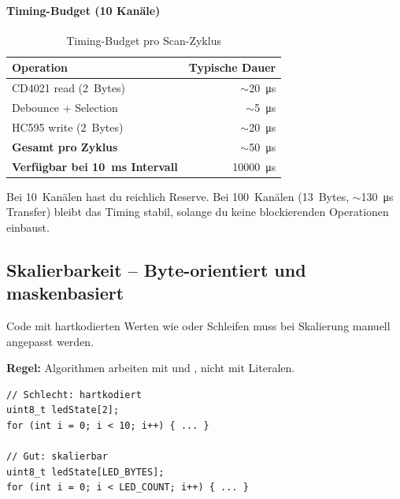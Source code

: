 \paragraph{Timing-Budget (10 Kanäle)}

\begin{table}[H]
\centering
\caption{Timing-Budget pro Scan-Zyklus}
\label{tab:timing-budget}
\begin{tabular}{@{}l r@{}}
\toprule
\textbf{Operation} & \textbf{Typische Dauer} \\
\midrule
CD4021 read (2~Bytes)              & $\sim$\SI{20}{\micro\second} \\
Debounce + Selection               & $\sim$\SI{5}{\micro\second} \\
HC595 write (2~Bytes)              & $\sim$\SI{20}{\micro\second} \\
\midrule
\textbf{Gesamt pro Zyklus}         & $\sim$\SI{50}{\micro\second} \\
\textbf{Verfügbar bei \SI{10}{\milli\second} Intervall} & \SI{10000}{\micro\second} \\
\bottomrule
\end{tabular}
\end{table}

\begin{infobox}[Konsequenz]
Bei 10~Kanälen hast du reichlich Reserve. Bei 100~Kanälen (13~Bytes,
$\sim$\SI{130}{\micro\second} Transfer) bleibt das Timing stabil, solange du
keine blockierenden Operationen einbaust.
\end{infobox}

\subsection{Skalierbarkeit -- Byte-orientiert und maskenbasiert}
\label{subsec:skalierbarkeit}

Code mit hartkodierten Werten wie  oder Schleifen
 muss bei Skalierung manuell angepasst werden.

\textbf{Regel:} Algorithmen arbeiten mit  und ,
nicht mit Literalen.

\begin{lstlisting}[style=arduino,caption={Skalierbare vs.\ hartkodierte Implementierung},label={lst:skalierbar}]
// Schlecht: hartkodiert
uint8_t ledState[2];
for (int i = 0; i < 10; i++) { ... }

// Gut: skalierbar
uint8_t ledState[LED_BYTES];
for (int i = 0; i < LED_COUNT; i++) { ... }
\end{lstlisting}

